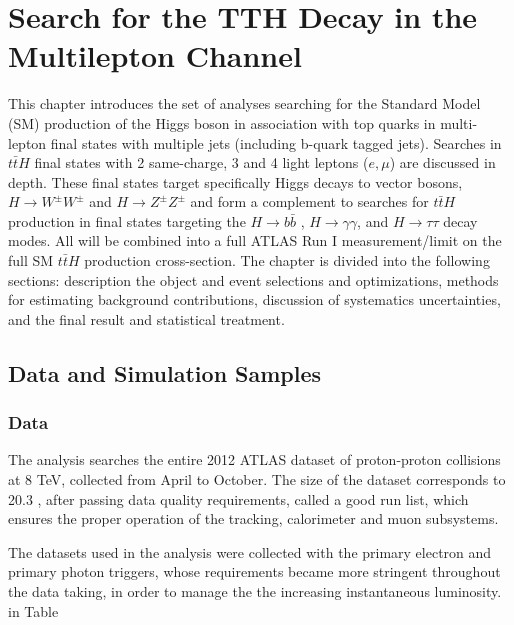 \chapter[Search for the TTH Decay in the Multilepton Channel][Search for the TTH Decay in the Multilepton Channel]{Search for the TTH Decay in the Multilepton Channel}

This chapter introduces the set of analyses searching for the Standard Model (SM) production of the Higgs boson in association with top quarks in multi-lepton
final states with multiple jets (including b-quark tagged jets). Searches in $t\bar{t}H$ final states with 2 same-charge, 3 and 4 light leptons ($e, \mu$)
are discussed in depth. These final states target specifically Higgs decays to vector bosons, $H\rightarrow W^{\pm}W^{\pm}$ and $H\rightarrow Z^{\pm}Z^{\pm}$
and form a complement to searches for $t\bar{t}H$ production in final states targeting the $H\rightarrow b\bar{b}$ \cite{paper1}, $H\rightarrow\gamma\gamma$\cite{paper2}, and $H\rightarrow\tau\tau$
decay modes. All will be combined into a full ATLAS Run I measurement/limit on the full SM $t\bar{t}H$ production cross-section. The chapter is divided into the following sections: description the object and event selections and optimizations, methods for estimating background contributions, discussion of systematics uncertainties, and the final result and statistical treatment. 

\section{Data and Simulation Samples}

\subsection{Data}

The analysis searches the entire 2012 ATLAS dataset of proton-proton collisions at 8 TeV, collected
from April to October. The size of the dataset corresponds to 20.3 \ifb, after passing data quality
requirements, called a good run list, which ensures the proper operation of the tracking, calorimeter
and muon subsystems. \cite{} 

The datasets used in the analysis were collected with the primary electron and primary photon triggers,
whose requirements became more stringent throughout the data taking, in order to manage the the increasing instantaneous
luminosity. in Table


